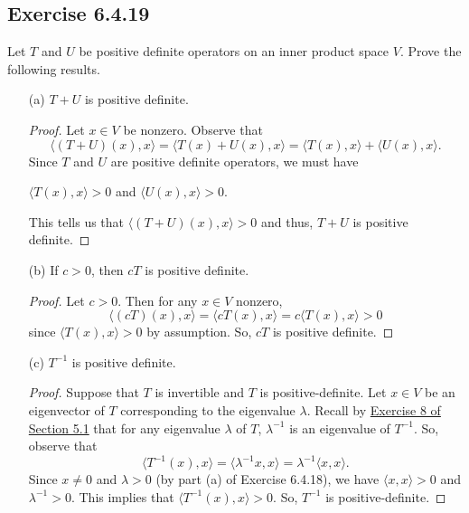\subsection*{Exercise 6.4.19} Let \( T  \) and \( U  \) be positive definite operators on an inner product space \( V  \). Prove the following results.
\begin{enumerate}
    \item[(a)] \( T + U  \) is positive definite.
        \begin{proof}
         Let \( x \in V  \) be nonzero. Observe that  
        \[  \langle (T+U)(x) , x \rangle = \langle T(x) + U(x) , x  \rangle = \langle T(x) , x  \rangle + \langle U(x) , x \rangle.  \]
        Since \( T  \) and \( U  \) are positive definite operators, we must have 
        \begin{center}
            \( \langle T(x) , x \rangle > 0  \) and \( \langle U(x) , x \rangle > 0  \).
        \end{center}
        This tells us that \( \langle (T+U)(x) , x \rangle > 0   \) and thus, \( T + U  \) is positive definite.
\end{proof}
    \item[(b)] If \( c > 0  \), then \( cT  \) is positive definite.
        \begin{proof}
        Let \( c > 0  \). Then for any \( x \in V  \) nonzero, 
        \[  \langle (cT)(x) , x  \rangle = \langle c T(x) , x \rangle = c \langle T(x) , x \rangle > 0  \]
        since \( \langle T(x) , x \rangle > 0  \) by assumption. So, \( cT \) is positive definite.
        \end{proof}
    \item[(c)] \( T^{-1}  \) is positive definite.
        \begin{proof}
            Suppose that \( T  \) is invertible and \( T  \) is positive-definite. Let \( x \in V   \) be an eigenvector of \( T  \) corresponding to the eigenvalue \( \lambda \). Recall by {\hyperref[Exercise 5.1.8]{Exercise 8 of Section 5.1}} that for any eigenvalue \( \lambda \) of \( T  \), \( \lambda^{-1} \) is an eigenvalue of \( T^{-1} \). So, observe that
            \[  \langle T^{-1}(x) , x \rangle = \langle \lambda^{-1} x  , x  \rangle = \lambda ^{-1} \langle x  ,  x  \rangle.  \]
            Since \( x \neq 0  \) and \( \lambda > 0  \) (by part (a) of Exercise 6.4.18), we have \( \langle x  , x  \rangle > 0  \) and \( \lambda^{-1} > 0 \). This implies that \( \langle T^{-1}(x) , x \rangle > 0  \). So, \( T^{-1}  \) is positive-definite.  
        \end{proof}
\end{enumerate}

